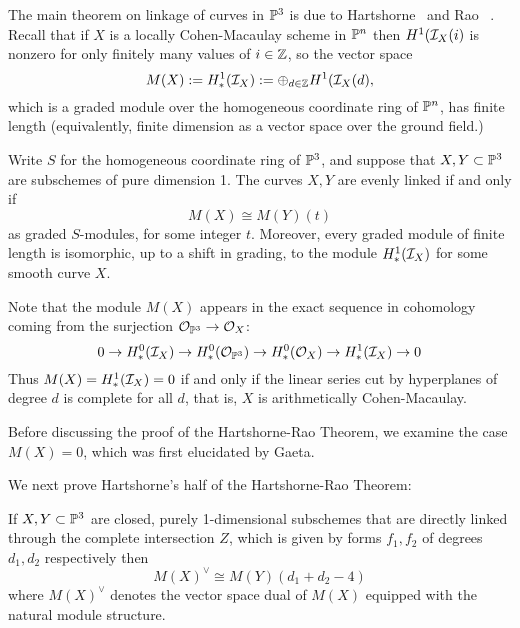 The main theorem on linkage of curves in $\PP^3$ is due to Hartshorne~\cite{} and Rao ~\cite{}. Recall  that if $X$ is a locally Cohen-Macaulay scheme in $\PP^n$ then $H^1(\sI_X(i)$ is nonzero for only finitely many values of $i\in \ZZ$, so
the vector space
$$
M(X) := H^1_*(\sI_X) := \oplus_{d\in \ZZ}H^1(\sI_X(d),
$$
which is a graded module over the homogeneous coordinate ring of $\PP^n$, has finite length (equivalently, finite dimension as a 
vector space over the ground field.)

\begin{theorem}
Write $S$ for the homogeneous coordinate ring
of $\PP^3$, and suppose that $X,Y\subset \PP^3$ are subschemes of pure dimension 1. The curves $X,Y$ are evenly linked if and only if 
$$
M(X) \cong M(Y)(t)
$$
as graded $S$-modules, for some integer $t$. Moreover, every graded module of finite length is isomorphic, up to a shift in grading,
to the module $H^1_*(\sI_X)$ for some smooth curve $X$.
\end{theorem}

Note that the module $M(X)$ appears in the exact sequence in cohomology coming from the surjection $\sO_{\PP^3} \to \sO_X$:
$$
0\to H^0_*(\sI_X) \to H^0_*(\sO_{\PP^3}) \to H^0_*(\sO_X) \to H^1_*(\sI_X) \to 0
$$
Thus $M(X) = H^1_*(\sI_X) = 0$ if and only if the linear series cut by hyperplanes of degree $d$ is complete for all $d$, that is,
$X$ is arithmetically Cohen-Macaulay.

Before discussing the proof of the Hartshorne-Rao Theorem, we examine the case $M(X) = 0$, which was first elucidated by Gaeta. 

\begin{theorem}
 
\end{theorem}

\begin{theorem}
\end{theorem}

\begin{theorem} 
\end{theorem}

We next prove Hartshorne's half of the Hartshorne-Rao Theorem:

\begin{theorem} 
If $X,Y\subset \PP^3$ are closed, purely 1-dimensional subschemes that are directly linked 
through the complete intersection $Z$, which is given by forms $f_1, f_2$ of degrees $d_1,d_2$ respectively
then
$$
M(X)^\vee \cong M(Y)(d_1+d_2-4)
$$
where $M(X)^\vee$ denotes the vector space dual of $M(X)$ equipped with the natural module structure.
 \end{theorem}

